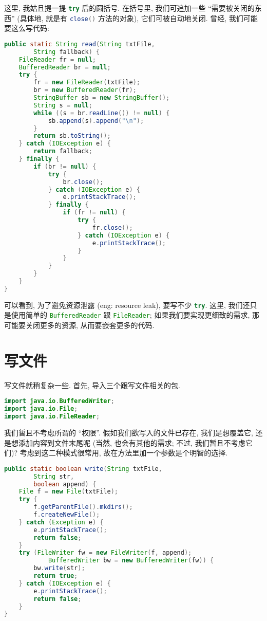 这里, 我姑且提一提 \lstinline[language=Java]`try` 后的圆括号.
在括号里, 我们可追加一些 ``需要被关闭的东西''
(具体地, 就是有 \lstinline[language=Java]`close()` 方法的对象),
它们可被自动地关闭.
曾经, 我们可能要这么写代码:
\begin{lstlisting}[frame=single,language=Java]
public static String read(String txtFile,
        String fallback) {
    FileReader fr = null;
    BufferedReader br = null;
    try {
        fr = new FileReader(txtFile);
        br = new BufferedReader(fr);
        StringBuffer sb = new StringBuffer();
        String s = null;
        while ((s = br.readLine()) != null) {
            sb.append(s).append("\n");
        }
        return sb.toString();
    } catch (IOException e) {
        return fallback;
    } finally {
        if (br != null) {
            try {
                br.close();
            } catch (IOException e) {
                e.printStackTrace();
            } finally {
                if (fr != null) {
                    try {
                        fr.close();
                    } catch (IOException e) {
                        e.printStackTrace();
                    }
                }
            }
        }
    }
}
\end{lstlisting}

可以看到, 为了避免资源泄露 (\gls{eng}: resource leak),
要写不少 \lstinline[language=Java]`try`.
这里, 我们还只是使用简单的
\lstinline[language=Java]`BufferedReader`
跟
\lstinline[language=Java]`FileReader`;
如果我们要实现更细致的需求,
那可能要关闭更多的资源,
从而要嵌套更多的代码.

\section{写文件}

写文件就稍复杂一些.
首先, 导入三个跟写文件相关的包.
\begin{lstlisting}[language=Java]
import java.io.BufferedWriter;
import java.io.File;
import java.io.FileReader;
\end{lstlisting}

我们暂且不考虑所谓的 ``权限''.
假如我们欲写入的文件已存在,
我们是想覆盖它,
还是想添加内容到文件末尾呢
(当然, 也会有其他的需求;
不过, 我们暂且不考虑它们)?
考虑到这二种模式很常用,
故在方法里加一个参数是个明智的选择.

\begin{lstlisting}[frame=single,language=Java]
public static boolean write(String txtFile,
        String str,
        boolean append) {
    File f = new File(txtFile);
    try {
        f.getParentFile().mkdirs();
        f.createNewFile();
    } catch (Exception e) {
        e.printStackTrace();
        return false;
    }
    try (FileWriter fw = new FileWriter(f, append);
            BufferedWriter bw = new BufferedWriter(fw)) {
        bw.write(str);
        return true;
    } catch (IOException e) {
        e.printStackTrace();
        return false;
    }
}
\end{lstlisting}

